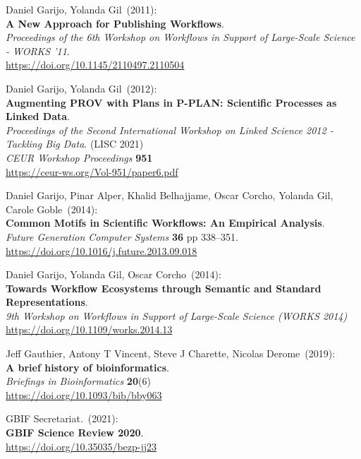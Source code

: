 \begin{thebibliography}{9}
Daniel Garijo, Yolanda Gil~(2011): \\
\textbf{A New Approach for Publishing Workflows}.\\
\emph{Proceedings of the 6th Workshop on Workflows in Support of Large-Scale Science - WORKS '11}.\\
\url{https://doi.org/10.1145/2110497.2110504}

 Daniel Garijo, Yolanda Gil~(2012): \\
\textbf{Augmenting PROV with Plans in P-PLAN: Scientific Processes as Linked Data}.\\
\emph{Proceedings of the Second International Workshop on Linked Science 2012 - Tackling Big Data}. (LISC 2021)\\
\emph{CEUR Workshop Proceedings} \textbf{951}\\
\url{https://ceur-ws.org/Vol-951/paper6.pdf}

Daniel Garijo, Pinar Alper, Khalid Belhajjame, Oscar Corcho, Yolanda Gil, Carole Goble~(2014): \\
\textbf{Common Motifs in Scientific Workflows: An Empirical Analysis}.\\
\emph{Future Generation Computer Systems} \textbf{36} pp 338--351.\\
\url{https://doi.org/10.1016/j.future.2013.09.018}

Daniel Garijo, Yolanda Gil, Oscar Corcho~(2014): \\
\textbf{Towards Workflow Ecosystems through Semantic and Standard Representations}.\\
\emph{9th Workshop on Workflows in Support of Large-Scale Science (WORKS 2014)}\\
\url{https://doi.org/10.1109/works.2014.13} 

Jeff Gauthier, Antony T Vincent, Steve J Charette, Nicolas Derome~(2019): \\
\textbf{A brief history of bioinformatics}.\\
\emph{Briefings in Bioinformatics} \textbf{20}(6)\\
\url{https://doi.org/10.1093/bib/bby063}

GBIF Secretariat.~(2021): \\
\textbf{GBIF Science Review 2020}.\\
\url{https://doi.org/10.35035/bezp-jj23}


\end{thebibliography}
